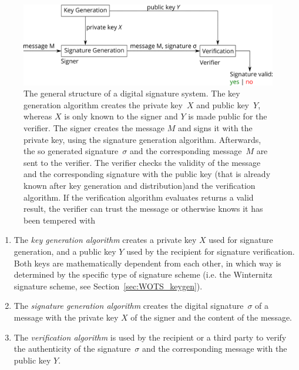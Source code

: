 \begin{figure}
\centering
\includegraphics[width=\linewidth]{images/Background/Digital_Signaturesystem_Simple.png}
\caption{The general structure of a digital signature system. The key generation algorithm creates the private key~$X$ and public key~$Y$, whereas $X$ is only known to the signer and $Y$ is made public for the verifier. The signer creates the message $M$ and signs it with the private key, using the signature generation algorithm. Afterwards, the so generated signature~$\sigma$ and the corresponding message~$M$ are sent to the verifier. The verifier checks the validity of the message and the corresponding signature with the public key (that is already known after key generation and distribution)and the verification algorithm. If the verification algorithm evaluates returns a valid result, the verifier can trust the message or otherwise knows it has been tempered with}
\label{img:digital_sign_system_simple}
\end{figure} 

\begin{enumerate}
\item The \textit{key generation algorithm} creates a private key $X$ used for signature generation, and a public key $Y$ used by the recipient for signature verification. Both keys are mathematically dependent from each other, in which way is determined by the specific type of signature scheme (i.e. the Winternitz signature scheme, see Section~\ref{sec:WOTS_keygen}). %
\item The \textit{signature generation algorithm} creates the digital signature~$\sigma$ of a message with the private key $X$ of the signer and the content of the message.
\item The \textit{verification algorithm} is used by the recipient or a third party to verify the authenticity of the signature~$\sigma$ and the corresponding message with the public key $Y$.
\end{enumerate}

